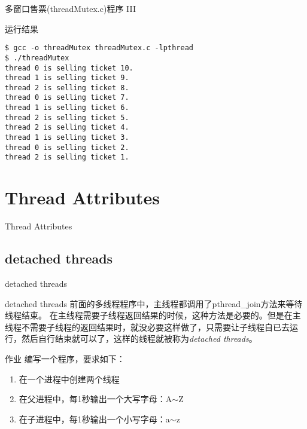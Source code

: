 \documentclass{beamer}
\begin{document}
\begin{frame}[fragile]{多窗口售票(threadMutex.c)程序 III}
\begin{block}{运行结果}
\begin{verbatim}
$ gcc -o threadMutex threadMutex.c -lpthread
$ ./threadMutex 
thread 0 is selling ticket 10.
thread 1 is selling ticket 9.
thread 2 is selling ticket 8.
thread 0 is selling ticket 7.
thread 1 is selling ticket 6.
thread 2 is selling ticket 5.
thread 2 is selling ticket 4.
thread 1 is selling ticket 3.
thread 0 is selling ticket 2.
thread 2 is selling ticket 1.
\end{verbatim}
\end{block}
\end{frame}

\section{Thread Attributes}
\begin{frame}{}
\Huge{\centerline{Thread Attributes}}
\end{frame}
\subsection{detached threads}
\begin{frame}{}
\Huge{\centerline{detached threads}}
\end{frame}
\begin{frame}{detached threads}
前面的多线程程序中，主线程都调用了pthread\_join方法来等待线程结束。
在主线程需要子线程返回结果的时候，这种方法是必要的。但是在主线程不需要子线程的返回结果时，就没必要这样做了，只需要让子线程自已去运行，然后自行结束就可以了，这样的线程就被称为\emph{detached threads}。
\end{frame}
\begin{frame}{作业}
编写一个程序，要求如下：
\begin{enumerate}
\item
在一个进程中创建两个线程
\item
在父进程中，每1秒输出一个大写字母：A$\sim$Z
\item
在子进程中，每1秒输出一个小写字母：a$\sim$z
\end{enumerate}
\end{frame}
\end{document}
